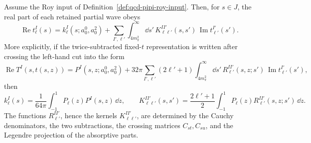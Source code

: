 \begin{proposition}
\label{prop:qcd-roy-projection-construction}
Assume the Roy input of Definition~\ref{def:qcd-pipi-roy-input}.  Then, for
\(s\in J\), the real part of each retained partial wave obeys
\begin{equation}
  \operatorname{Re}t_\ell^I(s)
  =
  k_\ell^I(s;a_0^0,a_0^2)
  +
  \sum_{I',\ell'}\int_{4m_\pi^2}^{\infty}\dd s'\,
  K_{\ell\ell'}^{II'}(s,s')\,\operatorname{Im}t_{\ell'}^{I'}(s').
  \label{eq:qcd-roy-equation-projected}
\end{equation}
More explicitly, if the twice-subtracted fixed-\(t\) representation is written
after crossing the left-hand cut into the form
\begin{equation}
  \operatorname{Re}T^I(s,t(s,z))
  =
  P^I(s,z;a_0^0,a_0^2)
  +
  32\pi
  \sum_{I',\ell'}(2\ell'+1)
  \int_{4m_\pi^2}^{\infty}\dd s'\,
  R_{\ell'}^{II'}(s,z;s')\,
  \operatorname{Im}t_{\ell'}^{I'}(s'),
  \label{eq:qcd-fixed-t-roy-resolvent-form}
\end{equation}
then
\begin{equation}
  k_\ell^I(s)
  =
  \frac1{64\pi}\int_{-1}^1
  P_\ell(z)P^I(s,z)\,\dd z,
  \qquad
  K_{\ell\ell'}^{II'}(s,s')
  =
  \frac{2\ell'+1}{2}
  \int_{-1}^1
  P_\ell(z)R_{\ell'}^{II'}(s,z;s')\,\dd z .
  \label{eq:qcd-roy-kernel-projection-definition}
\end{equation}
The functions \(R_{\ell'}^{II'}\), hence the kernels
\(K_{\ell\ell'}^{II'}\), are determined by the Cauchy denominators, the two
subtractions, the crossing matrices \(C_{st},C_{su}\), and the Legendre
projection of the absorptive parts.
\end{proposition}

